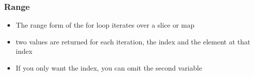 \documentclass[14pt]{beamer}
\begin{document}
{\begin{frame}
\begin{columns}
\begin{column}{0.4\textwidth}
        \end{column}
    \end{columns}
\end{frame}
}

{
\begin{frame}
    \frametitle{Range}
    \begin{itemize}
        \item The range form of the for loop iterates over a slice or map
        \item two values are returned for each iteration, the index and the element at that index
        \item If you only want the index, you can omit the second variable
    \end{itemize}
\end{frame}
}
\end{document}
